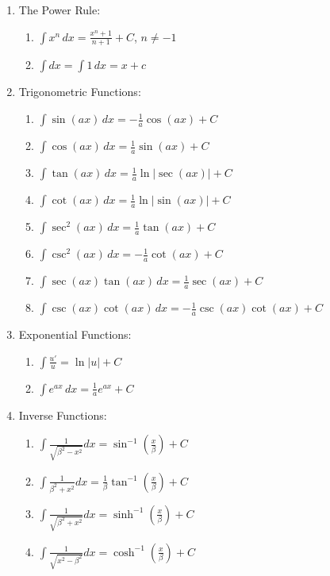\documentclass[14pt]{article}
\begin{document}
    \begin{enumerate}
        \item The Power Rule:
        \begin{enumerate}
            \item $\int x^n \, dx= \frac{x^n+1}{n+1}+C$, $n\neq-1$
            \item $\int dx=\int 1\, dx= x+c$
        \end{enumerate}
        \item Trigonometric Functions:
        \begin{enumerate}
            \item $\int\sin(ax)\, dx=-\frac{1}{a}\cos(ax)+C$
            \item $\int\cos(ax)\, dx=\frac{1}{a}\sin(ax)+C$
            \item $\int\tan(ax)\, dx=\frac{1}{a}\ln|\sec(ax)|+C$
            \item $\int\cot(ax)\, dx=\frac{1}{a}\ln|\sin(ax)|+C$
            \item $\int\sec^2(ax)\, dx=\frac{1}{a}\tan(ax)+C$
            \item $\int\csc^2(ax)\, dx=-\frac{1}{a}\cot(ax)+C$
            \item $\int\sec(ax)\tan(ax)\, dx=\frac{1}{a}\sec(ax)+C$
            \item $\int\csc(ax)\cot(ax)\,
            dx=-\frac{1}{a}\csc(ax)\cot(ax)+C$
        \end{enumerate}
        \item Exponential Functions:
        \begin{enumerate}
            \item $\int\frac{u'}{u}=\ln|u|+C$
            \item $\int e^{ax}\, dx=\frac{1}{a} e^{ax}+C$
        \end{enumerate}
        \item Inverse Functions:
        \begin{enumerate}
            \item
            $\int\frac{1}{\sqrt{\beta^2-x^2}}dx=\sin^{-1}\left(\frac{x}{\beta}\right)+C$
            \item
            $\int\frac{1}{\beta^2+x^2}dx=\frac{1}{\beta}\tan^{-1}\left(\frac{x}{\beta}\right)+C$
            \item
            $\int\frac{1}{\sqrt{\beta^2+x^2}}dx=\sinh^{-1}\left(\frac{x}{\beta}\right)+C$
            \item
            $\int\frac{1}{\sqrt{x^2-\beta^2}}dx=\cosh^{-1}\left(\frac{x}{\beta}\right)+C$
        \end{enumerate}
    \end{enumerate}
\end{document}
